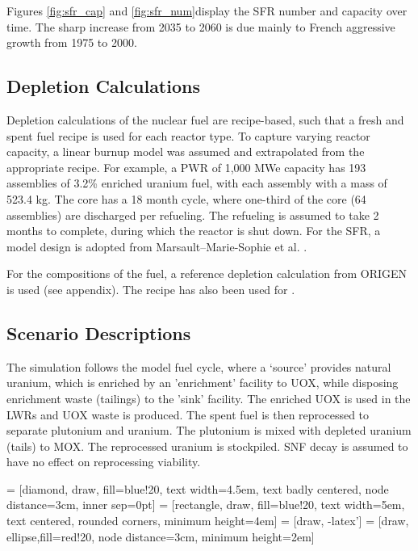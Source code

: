 Figures \ref{fig:sfr_cap} and \ref{fig:sfr_num}display
the \gls{SFR} number and capacity over time.
The sharp increase from 2035 to 2060 is due mainly to
French aggressive growth from 1975 to 2000.



\subsection{Depletion Calculations}
Depletion calculations of the nuclear fuel are recipe-based, such that a fresh 
and spent fuel recipe is used for each reactor type. To capture varying reactor 
capacity, a linear burnup model was assumed and extrapolated from the 
appropriate recipe. For example, a PWR of
1,000 MWe capacity has 193 assemblies of 3.2\% enriched
uranium fuel, with each assembly with a mass of 523.4 kg.
The core has a 18 month cycle, where one-third of the 
core (64 assemblies) are discharged per refueling. The refueling
is assumed to take 2 months to complete, during which the reactor
is shut down. For the \gls{SFR}, a model design is adopted from
Marsault–Marie-Sophie et al. \cite{marsaultmarie-sophie_pre-conceptual_2012}.

For the compositions of the fuel, a reference depletion calculation
from ORIGEN is used (see appendix). The recipe has also been used for
\cite{wilson_adoption_2009}.

\subsection{Scenario Descriptions}
The simulation follows the model fuel cycle, where a `source'
provides natural uranium, which is enriched by an 'enrichment'
facility to \gls{UOX}, while disposing enrichment waste (tailings)
to the 'sink' facility. The enriched \gls{UOX} is used
in the \gls{LWR}s and \gls{UOX} waste is produced. The spent fuel
is then reprocessed to separate plutonium and uranium.
The plutonium is mixed with depleted uranium (tails) to \gls{MOX}.
The reprocessed uranium is stockpiled. \gls{SNF} decay is assumed
to have no effect on reprocessing viability.


 = [diamond, draw, fill=blue!20, 
text width=4.5em, text badly centered, node distance=3cm, inner sep=0pt]
 = [rectangle, draw, fill=blue!20, 
text width=5em, text centered, rounded corners, minimum height=4em]
 = [draw, -latex']
 = [draw, ellipse,fill=red!20, node distance=3cm,
minimum height=2em]


